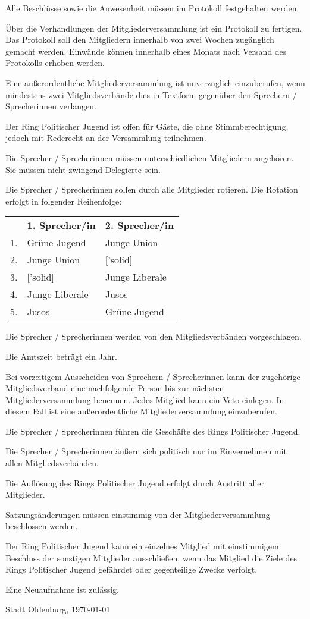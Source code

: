 \documentclass[10pt,a4paper,oneside,parskip=half]{scrartcl}
\begin{document}
\begin{contract}
Alle Beschlüsse sowie die Anwesenheit müssen im Protokoll festgehalten werden.

Über die Verhandlungen der Mitgliederversammlung ist ein Protokoll zu fertigen. Das Protokoll soll den Mitgliedern innerhalb von zwei Wochen zugänglich gemacht werden. Einwände können innerhalb eines Monats nach Versand des Protokolls erhoben werden.

Eine außerordentliche Mitgliederversammlung ist unverzüglich einzuberufen, wenn mindestens zwei Mitgliedsverbände dies in Textform gegenüber den Sprechern / Sprecherinnen verlangen.

Der Ring Politischer Jugend ist offen für Gäste, die ohne Stimmberechtigung, jedoch mit Rederecht an der Versammlung teilnehmen.

Die Sprecher / Sprecherinnen müssen unterschiedlichen Mitgliedern angehören. Sie müssen nicht zwingend Delegierte sein.

Die Sprecher / Sprecherinnen sollen durch alle Mitglieder rotieren. Die Rotation erfolgt in folgender Reihenfolge:\\
\begin{tabu} to \textwidth {l X X}
& \textbf{1. Sprecher/in} & \textbf{2. Sprecher/in} \\
1. & Grüne Jugend & Junge Union \\
2. & Junge Union & ['solid] \\
3. & ['solid] & Junge Liberale \\
4. & Junge Liberale & Jusos \\
5. & Jusos & Grüne Jugend \\
\end{tabu}

Die Sprecher / Sprecherinnen werden von den Mitgliedsverbänden vorgeschlagen.

Die Amtszeit beträgt ein Jahr.

Bei vorzeitigem Ausscheiden von Sprechern / Sprecherinnen kann der zugehörige Mitgliedsverband eine nachfolgende Person bis zur nächsten Mitgliederversammlung benennen. Jedes Mitglied kann ein Veto einlegen. In diesem Fall ist eine außerordentliche Mitgliederversammlung einzuberufen.

Die Sprecher / Sprecherinnen führen die Geschäfte des Rings Politischer Jugend.

Die Sprecher / Sprecherinnen äußern sich politisch nur im Einvernehmen mit allen Mitgliedsverbänden.

Die Auflösung des Rings Politischer Jugend erfolgt durch Austritt aller Mitglieder.

Satzungsänderungen müssen einstimmig von der Mitgliederversammlung beschlossen werden.

Der Ring Politischer Jugend kann ein einzelnes Mitglied mit einstimmigem Beschluss der sonstigen Mitglieder ausschließen, wenn das Mitglied die Ziele des Rings Politischer Jugend gefährdet oder gegenteilige Zwecke verfolgt.

Eine Neuaufnahme ist zulässig.

\end{contract}
\vspace{1cm}
Stadt Oldenburg, \today
\end{document}
